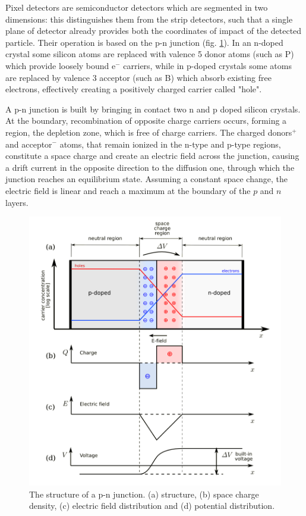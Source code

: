 Pixel detectors are semiconductor detectors which are segmented in two dimensions: this distinguishes them from the strip detectors, such that a single plane of detector already provides both the coordinates of impact of the detected particle. 
Their operation is based on the p-n junction (fig. \ref{fig:junction}). 
In an n-doped crystal some silicon atoms are replaced with valence 5 donor atoms (such as P) which provide loosely bound e$^-$ carriers, while in p-doped crystals some atoms are replaced by valence 3 acceptor (such as B) which absorb existing free electrons, effectively creating a positively charged carrier called "hole".

A p-n junction is built by bringing in contact two n and p doped silicon crystals. At the boundary, recombination of opposite charge carriers occurs, forming a region, the depletion zone, which is free of charge carriers. The charged donors$^{+}$ and acceptor$^{-}$ atoms, that remain ionized in the n-type and p-type regions, constitute a space charge and create an electric field across the junction, causing a drift current in the opposite direction to the diffusion one, through which the junction reaches an equilibrium state. Assuming a constant space change, the electric field is linear and reach a maximum at the boundary of the $p$ and $n$ layers.
\begin{figure}[h!]
   \centering
   \includegraphics[width=.69\linewidth]{figures/Pixel_detectors/junction.png}
   \caption{The structure of a p-n junction. (a) structure, (b) space charge density, (c) electric field distribution and (d) potential distribution. }
   \label{fig:junction}
\end{figure}

